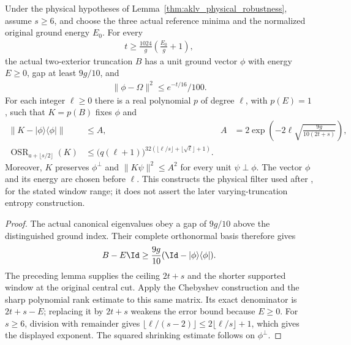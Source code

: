 \begin{lemma}
    \label{thm:aklv_clipped_physical_filter}
    \leanok
    Under the physical hypotheses of
    Lemma~\ref{thm:aklv_physical_robustness}, assume $s\ge6$, and choose the three actual
    reference minima and the normalized original ground energy $E_0$.
    For every
    \begin{align*}
        t\ge\frac{1024}{g}\left(\frac{E_0}{g}+1\right),
    \end{align*}
    the actual two-exterior truncation $B$ has a unit ground vector $\phi$
    with energy $E\ge0$, gap at least $9g/10$, and
    \begin{align*}
        \|\phi-\Omega\|^2\le e^{-t/16}/100.
    \end{align*}
    For each integer $\ell\ge0$ there is a real polynomial $p$ of degree
    $\ell$, with $p(E)=1$, such that $K=p(B)$ fixes $\phi$ and
    \begin{align*}
        \|K-|\phi\rangle\langle\phi|\|
         & \le A,
         & A                           & =2\exp\left(-2\ell\sqrt{\frac{9g}{10(2t+s)}}\right), \\
        \operatorname{OSR}_{a+\lfloor s/2\rfloor}(K)
         & \le\bigl(q(\ell+1)\bigr)^ {
                32(\lfloor\ell/s\rfloor+\lfloor\sqrt\ell\rfloor+1)}.
    \end{align*}
    Moreover, $K$ preserves $\phi^\perp$ and
    $\|K\psi\|^2\le A^2$ for every unit $\psi\perp\phi$.
    The vector $\phi$ and its energy are chosen before $\ell$.
    This constructs the physical filter used after
    \cite[Theorem~6.1]{Arad2013AreaLaw}, for the stated window range;
    it does not assert the later varying-truncation entropy construction.
\end{lemma}
\begin{proof}
    \leanok
    The actual canonical eigenvalues obey a gap of $9g/10$ above the
    distinguished ground index. Their complete orthonormal basis therefore
    gives
    \begin{align*}
        B-E\Id\ge\frac{9g}{10}
        (\Id-|\phi\rangle\langle\phi|).
    \end{align*}
    The preceding lemma supplies the ceiling $2t+s$ and the shorter supported
    window at the original central cut. Apply the Chebyshev construction and
    the sharp polynomial rank estimate to this same matrix. Its exact
    denominator is $2t+s-E$; replacing it by $2t+s$ weakens the error bound
    because $E\ge0$. For $s\ge6$, division with remainder gives
    $\lfloor\ell/(s-2)\rfloor\le2\lfloor\ell/s\rfloor+1$, which
    gives the displayed exponent. The squared shrinking estimate follows on
    $\phi^\perp$.
\end{proof}

